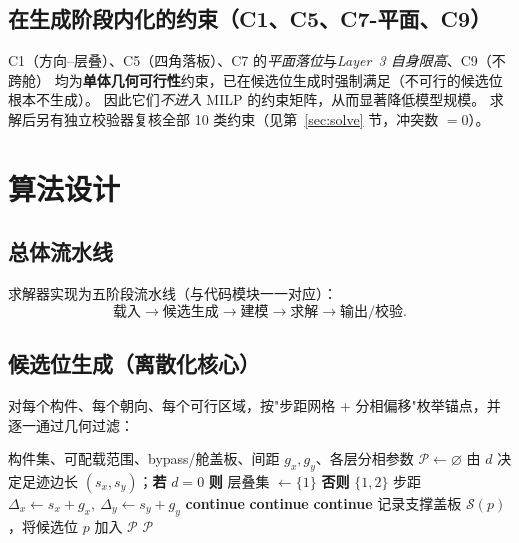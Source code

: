\documentclass[11pt]{article}
\begin{document}
\subsection{在生成阶段内化的约束（C1、C5、C7-平面、C9）}
C1（方向--层叠）、C5（四角落板）、C7 的\emph{平面落位}与\emph{Layer~3 自身限高}、C9（不跨舱）
均为\textbf{单体几何可行性}约束，已在候选位生成时强制满足（不可行的候选位根本不生成）。
因此它们\emph{不进入} MILP 的约束矩阵，从而显著降低模型规模。
求解后另有独立校验器复核全部 10 类约束（见第~\ref{sec:solve} 节，冲突数 $=0$）。

\section{算法设计}

\subsection{总体流水线}
求解器实现为五阶段流水线（与代码模块一一对应）：
\[
\text{载入} \rightarrow \text{候选生成} \rightarrow \text{建模} \rightarrow \text{求解} \rightarrow \text{输出/校验}.
\]

\subsection{候选位生成（离散化核心）}
对每个构件、每个朝向、每个可行区域，按"步距网格 + 分相偏移"枚举锚点，并逐一通过几何过滤：

\begin{algorithm}[ht]
\caption{分层候选位生成（要点）}
\label{alg:gen}
\begin{algorithmic}[1]
\Require 构件集、可配载范围、bypass/舱盖板、间距 $g_x,g_y$、各层分相参数
\State $\mathcal{P}\gets\varnothing$
  \State 由 $d$ 决定足迹边长 $(s_x,s_y)$；\textbf{若} $d=0$ \textbf{则} 层叠集 $\gets\{1\}$ \textbf{否则} $\{1,2\}$ 
  \State 步距 $\Delta_x\gets s_x+g_x,\ \Delta_y\gets s_y+g_y$
       \textbf{continue} \EndIf {}
       \textbf{continue} \EndIf {}
       \textbf{continue} \EndIf {}
      \State 记录支撑盖板 $\mathcal{S}(p)$，将候选位 $p$ 加入 $\mathcal{P}$
    \EndFor
  \EndFor
\EndFor
\State \Return $\mathcal{P}$
\end{algorithmic}
\end{algorithm}
\end{document}
